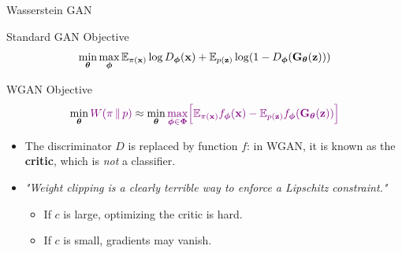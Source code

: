 \documentclass{beamer}
\begin{document}
\begin{frame}{Wasserstein GAN}
	\begin{block}{Standard GAN Objective}
		\vspace{-0.2cm}
		\[
			\min_{\boldsymbol{\theta}} \max_{\boldsymbol{\phi}} \mathbb{E}_{\pi(\mathbf{x})} \log D_{\boldsymbol{\phi}}(\mathbf{x}) + \mathbb{E}_{p(\mathbf{z})} \log (1 - D_{\boldsymbol{\phi}}(\mathbf{G}_{\boldsymbol{\theta}}(\mathbf{z})))
		\]
		\vspace{-0.3cm}
	\end{block}
	\begin{block}{WGAN Objective}
		\vspace{-0.3cm}
		\[
			\min_{\boldsymbol{\theta}} {\color{violet}W(\pi\,\|\,p)} \approx \min_{\boldsymbol{\theta}} {\color{violet}\max_{\boldsymbol{\phi} \in \boldsymbol{\Phi}} \Bigl[ \mathbb{E}_{\pi(\mathbf{x})} f_{\boldsymbol{\phi}}(\mathbf{x})  - \mathbb{E}_{p(\mathbf{z})} f_{\boldsymbol{\phi}}(\mathbf{G}_{\boldsymbol{\theta}}(\mathbf{z}))\Bigr]}
		\]
		\vspace{-0.3cm}
	\end{block}
	\eqpause
	\begin{itemize}
		\item The discriminator $D$ is replaced by function $f$: in WGAN, it is known as the \textbf{critic}, which is \emph{not} a classifier.
		\item \textit{"Weight clipping is a clearly terrible way to enforce a Lipschitz constraint."}
		\begin{itemize}
			\item If $c$ is large, optimizing the critic is hard.
			\item If $c$ is small, gradients may vanish.
		\end{itemize}
	\end{itemize}	
\end{frame}
\end{document}
